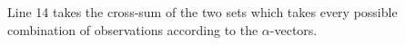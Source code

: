 \documentclass{article} %
\begin{document}
Line 14 takes the cross-sum of the two sets which takes every possible combination of observations according to the $\alpha$-vectors. 
\end{document}
